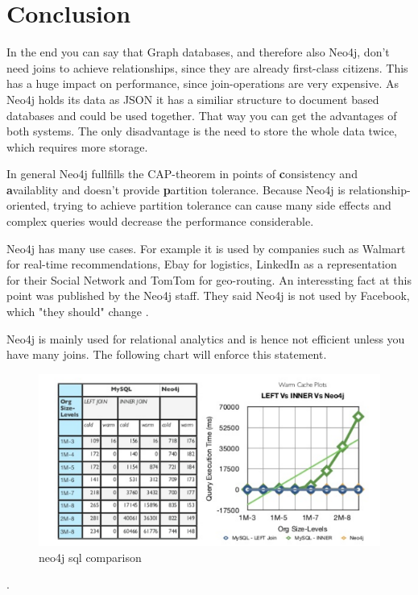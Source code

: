 \section{Conclusion}

In the end you can say that Graph databases, and therefore also Neo4j, don't need joins to achieve relationships, since they are already first-class citizens. This has a huge impact on performance, since join-operations are very expensive.
As Neo4j holds its data as JSON it has a similiar structure to document based databases and could be used together. That way you can get the advantages of both systems. The only disadvantage is the need to store the whole data twice, which requires more storage.

In general Neo4j fullfills the CAP-theorem in points of \textbf{c}onsistency and \textbf{a}vailablity and doesn't provide \textbf{p}artition tolerance. Because Neo4j is relationship-oriented, trying to achieve partition tolerance can cause many side effects and complex queries would decrease the performance considerable.

Neo4j has many use cases. For example it is used by companies such as Walmart for real-time recommendations, Ebay for logistics, LinkedIn as a representation for their Social Network and TomTom for geo-routing. An interessting fact at this point was published by the Neo4j staff. They said Neo4j is not used by Facebook, which "they should" change \cite[para. 5]{Neo4jStaff.2011}.

Neo4j is mainly used for relational analytics and is hence not efficient unless you have many joins. The following chart will enforce this statement.

\begin{figure}[H]
	\includegraphics[width=\linewidth,keepaspectratio]{images/neo4j/neo4j_joins.png}
	\caption{neo4j sql comparison}
\end{figure}  
\cite[slide 19]{Dalal.2014}.


